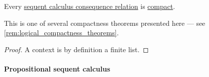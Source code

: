 \begin{proposition}\label{thm:sequent_calculus_consequence_compact}
  Every \hyperref[def:sequent_calculus_consequence]{sequent calculus consequence relation} is \hyperref[def:consequence_relation/compactness]{compact}.
\end{proposition}
\begin{comments}
  \item This is one of several compactness theorems presented here --- see \cref{rem:logical_compactness_theorems}.
\end{comments}
\begin{proof}
  A context is by definition a finite list.
\end{proof}

\paragraph{Propositional sequent calculus}

